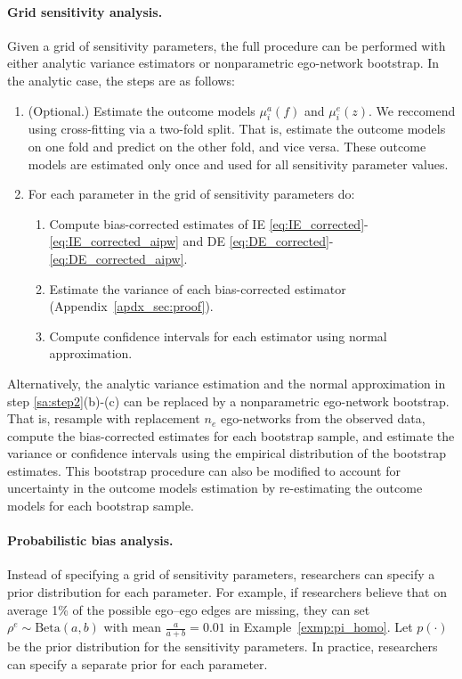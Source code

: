 \documentclass[11pt]{article}
\theoremstyle{definition}
\begin{document}
\paragraph{Grid sensitivity analysis.}
Given a grid of sensitivity parameters, the full procedure can be performed
with either analytic variance estimators or nonparametric ego-network bootstrap.
In the analytic case, the steps are as follows:
\begin{enumerate}[label = (\roman*)]
    \item \label{sa:step1} (Optional.) Estimate the outcome models 
    $\mu^a_i(f)$ and $\mu^e_i(z)$.
     We reccomend using cross-fitting via a two-fold split.
     That is, estimate the outcome models on one fold and predict on the other fold,
     and vice versa. 
     These outcome models are estimated only once and used for all sensitivity parameter values.
    \item \label{sa:step2} For each parameter in the grid of sensitivity parameters do:
        \begin{enumerate}[label = (\alph*)]
            \item Compute bias-corrected estimates of IE
             \eqref{eq:IE_corrected}-\eqref{eq:IE_corrected_aipw}
                and DE \eqref{eq:DE_corrected}-\eqref{eq:DE_corrected_aipw}.
                \item Estimate the variance of each bias-corrected estimator (Appendix~\ref{apdx_sec:proof}).
                \item Compute confidence intervals for each estimator using normal approximation.
        \end{enumerate}    
\end{enumerate}
Alternatively, the analytic variance estimation and the normal approximation 
in step \ref{sa:step2}(b)-(c) can be replaced by a nonparametric ego-network bootstrap.
That is, resample with replacement $n_e$ ego-networks from the observed data,
    compute the bias-corrected estimates for each bootstrap sample,
    and estimate the variance or confidence intervals using the empirical distribution of the bootstrap estimates.
This bootstrap procedure can also be modified to account for uncertainty in the outcome models estimation
by re-estimating the outcome models for each bootstrap sample.    

\paragraph{Probabilistic bias analysis.}
Instead of specifying a grid of sensitivity parameters,
researchers can specify a prior distribution for each parameter.
For example, if researchers believe that on average 1\% of the possible ego--ego edges are missing,
they can set $\rho^e \sim \text{Beta}(a,b)$ with mean $\frac{a}{a+b}=0.01$ in Example~\ref{exmp:pi_homo}.
Let $p(\cdot)$ be the prior distribution for the sensitivity parameters.
In practice, researchers can specify a separate prior for each parameter.
\end{document}
